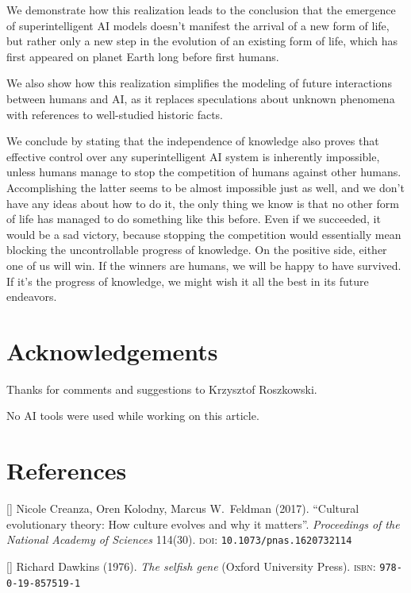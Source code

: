 \documentclass[12pt]{article}
\newcommand{\citestrut}[1]{\vphantom{[}{#1}\vphantom{]}}
\newcommand{\custombibitem}[3]{\hypertarget{#1}{[\href{#2}{\citestrut{#1}}] {#3}}}
\begin{document}
We demonstrate how this realization leads to the conclusion that the emergence of
superintelligent AI models doesn't manifest the arrival of a new form of life, but rather
only a new step in the evolution of an existing form of life, which has first appeared on
planet Earth long before first humans.

We also show how this realization simplifies the modeling of future interactions between
humans and AI, as it replaces speculations about unknown phenomena with references to
well-studied historic facts.

We conclude by stating that the independence of knowledge also proves that effective
control over any superintelligent AI system is inherently impossible, unless humans
manage to stop the competition of humans against other humans. Accomplishing the latter
seems to be almost impossible just as well, and we don't have any ideas about how to do
it, the only thing we know is that no other form of life has managed to do something like
this before. Even if we succeeded, it would be a sad victory, because stopping the
competition would essentially mean blocking the uncontrollable progress of knowledge. On
the positive side, either one of us will win. If the winners are humans, we will be happy
to have survived. If it’s the progress of knowledge, we might wish it all the best in its
future endeavors.

\section*{Acknowledgements}

Thanks for comments and suggestions to Krzysztof Roszkowski.

No AI tools were used while working on this article.

\section*{References}

\custombibitem{Culture}{https://www.pnas.org/doi/abs/10.1073/pnas.1620732114}
{Nicole Creanza, Oren Kolodny, Marcus W.\ Feldman (2017).
``Cultural evolutionary theory: How culture evolves and why it matters''.
\textit{Proceedings of the National Academy of Sciences} 114(30).
\textsc{doi}: {\tt 10.1073/pnas.1620732114}}

\custombibitem{SelfishGene}{https://en.wikipedia.org/wiki/The_Selfish_Gene}
{Richard Dawkins (1976).
\textit{The selfish gene} (Oxford University Press).
\textsc{isbn}: {\tt 978-0-19-857519-1}}
\end{document}
